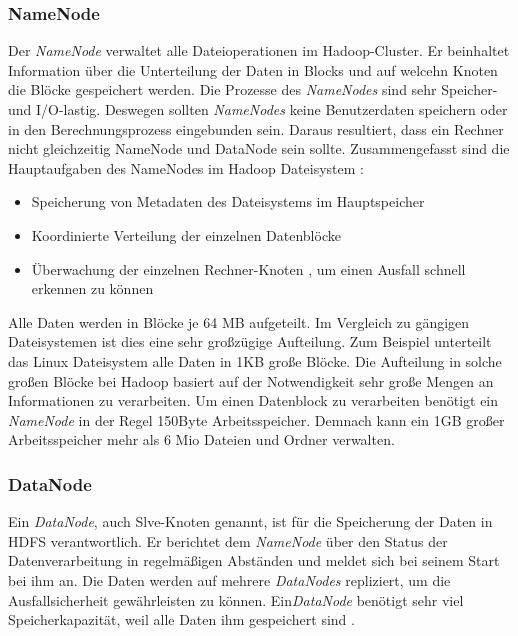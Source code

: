 \subsubsection{NameNode}
Der \textit{NameNode} verwaltet alle Dateioperationen im Hadoop-Cluster. Er beinhaltet Information über die Unterteilung der Daten in Blocks und auf welcehn Knoten die Blöcke gespeichert werden.
Die Prozesse des  \textit{NameNodes} sind sehr Speicher- und I/O-lastig. Deswegen sollten \textit{NameNodes} keine Benutzerdaten speichern oder in den Berechnungsprozess eingebunden sein. Daraus resultiert, dass ein Rechner nicht gleichzeitig NameNode und DataNode sein sollte.
Zusammengefasst sind die Hauptaufgaben des NameNodes im Hadoop Dateisystem  \cite[S. XX]{Wartal2012}:
\begin{itemize}
\item Speicherung von Metadaten des Dateisystems im Hauptspeicher
\item Koordinierte Verteilung der einzelnen Datenblöcke
\item Überwachung der einzelnen Rechner-Knoten , um einen Ausfall schnell erkennen zu können
\end{itemize}

Alle Daten werden in Blöcke je 64 MB aufgeteilt. Im Vergleich zu gängigen Dateisystemen ist dies eine sehr großzügige Aufteilung. Zum Beispiel unterteilt das Linux Dateisystem alle Daten in 1KB große Blöcke. Die Aufteilung in solche großen Blöcke bei Hadoop basiert auf der Notwendigkeit sehr große Mengen an Informationen zu verarbeiten. Um einen Datenblock zu verarbeiten benötigt ein \textit{NameNode} in der Regel 150Byte Arbeitsspeicher. Demnach kann ein 1GB großer Arbeitsspeicher mehr als 6 Mio Dateien und Ordner verwalten. \cite[S. XX]{Wartal2012}
\subsubsection{DataNode}
Ein \textit{DataNode}, auch Slve-Knoten genannt, ist für die Speicherung der Daten in \ac{HDFS} verantwortlich. Er berichtet dem \textit{NameNode} über den Status der Datenverarbeitung in regelmäßigen Abständen und meldet sich bei seinem Start bei ihm an. Die Daten werden auf mehrere \textit{DataNodes} repliziert, um die Ausfallsicherheit gewährleisten zu können.
Ein\textit{DataNode} benötigt sehr viel Speicherkapazität, weil alle Daten ihm gespeichert sind \cite{nameNode}.


